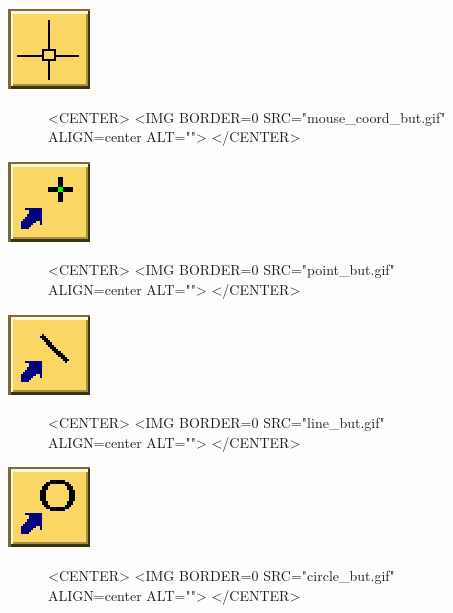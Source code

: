 \begin{ccTexOnly}
\mbox{\includegraphics{mouse_coord_but.eps}}
\end{ccTexOnly}
\begin{figure}
\begin{ccHtmlOnly}
<CENTER>
<IMG BORDER=0 SRC="mouse_coord_but.gif"  ALIGN=center  ALT="">
</CENTER>
\end{ccHtmlOnly}
\end{figure}

\begin{ccTexOnly}
\mbox{\includegraphics{point_but.eps}}
\end{ccTexOnly}
\begin{figure}
\begin{ccHtmlOnly}
<CENTER>
<IMG BORDER=0 SRC="point_but.gif"  ALIGN=center  ALT="">
</CENTER>
\end{ccHtmlOnly}
\end{figure}

\begin{ccTexOnly}
\mbox{\includegraphics{line_but.eps}}
\end{ccTexOnly}
\begin{figure}
\begin{ccHtmlOnly}
<CENTER>
<IMG BORDER=0 SRC="line_but.gif"  ALIGN=center  ALT="">
</CENTER>
\end{ccHtmlOnly}
\end{figure}

\begin{ccTexOnly}
\mbox{\includegraphics{circle_but.eps}}
\end{ccTexOnly}
\begin{figure}
\begin{ccHtmlOnly}
<CENTER>
<IMG BORDER=0 SRC="circle_but.gif"  ALIGN=center  ALT="">
</CENTER>
\end{ccHtmlOnly}
\end{figure}

